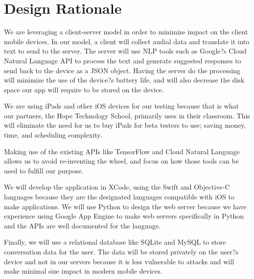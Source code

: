 \chapter{Design Rationale}

We are leveraging a client-server model in order to minimize impact on the client mobile devices. In our model, a client will collect audial data and translate it into text to send to the server. The server will use NLP tools such as Google?s Cloud Natural Language API to process the text and generate suggested responses to send back to the device as a JSON object. Having the server do the processing will minimize the use of the device?s battery life, and will also decrease the disk space our app will require to be stored on the device. 

We are using iPads and other iOS devices for our testing because that is what our partners, the Hope Technology School, primarily uses in their classroom. This will eliminate the need for us to buy iPads for beta testers to use; saving money, time, and scheduling complexity.

Making use of the existing APIs like TensorFlow and Cloud Natural Language allows us to avoid re-inventing the wheel, and focus on how those tools can be used to fulfill our purpose. 

We will develop the application in XCode, using the Swift and Objective-C languages because they are the designated languages compatible with iOS to make applications. We will use Python to design the web server because we have experience using Google App Engine to make web servers specifically in Python and the APIs are well documented for the language.

Finally, we will use a relational database like SQLite and MySQL to store conversation data for the user. The data will be stored privately on the user?s device and not in our servers because it is less vulnerable to attacks and will make minimal size impact in modern mobile devices.
